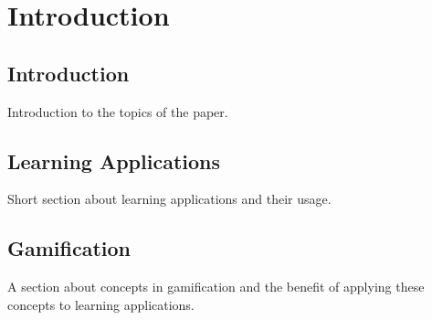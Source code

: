 
\chapter{Introduction}

\label{Chapter1}



\section{Introduction}

Introduction to the topics of the paper.


\section{Learning Applications}

Short section about learning applications and their usage.


\section{Gamification}

A section about concepts in gamification and the benefit of applying these concepts to learning applications.